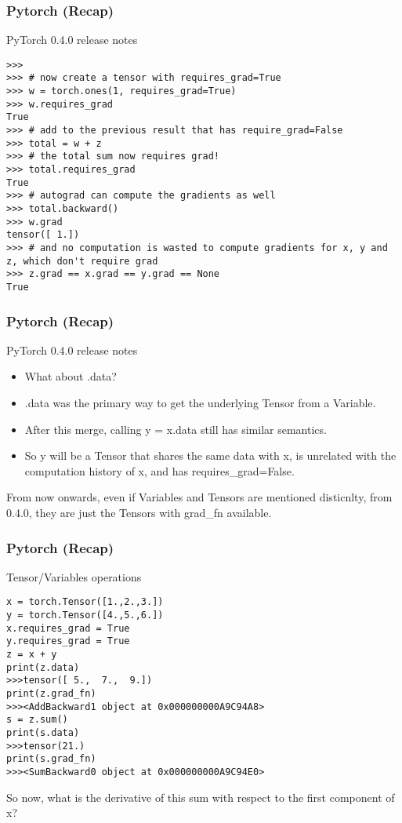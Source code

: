 \begin{frame}[fragile]
\frametitle{Pytorch (Recap)}
PyTorch 0.4.0 release notes
 \begin{lstlisting}
>>>
>>> # now create a tensor with requires_grad=True
>>> w = torch.ones(1, requires_grad=True)
>>> w.requires_grad
True
>>> # add to the previous result that has require_grad=False
>>> total = w + z
>>> # the total sum now requires grad!
>>> total.requires_grad
True
>>> # autograd can compute the gradients as well
>>> total.backward()
>>> w.grad
tensor([ 1.])
>>> # and no computation is wasted to compute gradients for x, y and z, which don't require grad
>>> z.grad == x.grad == y.grad == None
True
 \end{lstlisting}
 \end{frame} 
 
\begin{frame}[fragile]
\frametitle{Pytorch (Recap)}
PyTorch 0.4.0 release notes
\begin{itemize}
\item What about .data?
\item .data was the primary way to get the underlying Tensor from a Variable. 
\item After this merge, calling y = x.data still has similar semantics.
\item So y will be a Tensor that shares the same data with x, is unrelated with the computation history of x, and has requires\_grad=False.
\end{itemize}

From now onwards, even if Variables and Tensors are mentioned disticnlty, from 0.4.0, they are just the Tensors with grad\_fn available.
\end{frame} 
 
 
  
\begin{frame}[fragile]
\frametitle{Pytorch (Recap)}
Tensor/Variables operations
 \begin{lstlisting}
x = torch.Tensor([1.,2.,3.])
y = torch.Tensor([4.,5.,6.])
x.requires_grad = True
y.requires_grad = True
z = x + y
print(z.data)
>>>tensor([ 5.,  7.,  9.])
print(z.grad_fn)
>>><AddBackward1 object at 0x000000000A9C94A8>
s = z.sum()
print(s.data)
>>>tensor(21.)
print(s.grad_fn)
>>><SumBackward0 object at 0x000000000A9C94E0>
 \end{lstlisting}
So now, what is the derivative of this sum with respect to the first component of x? 
 \end{frame} 
 
